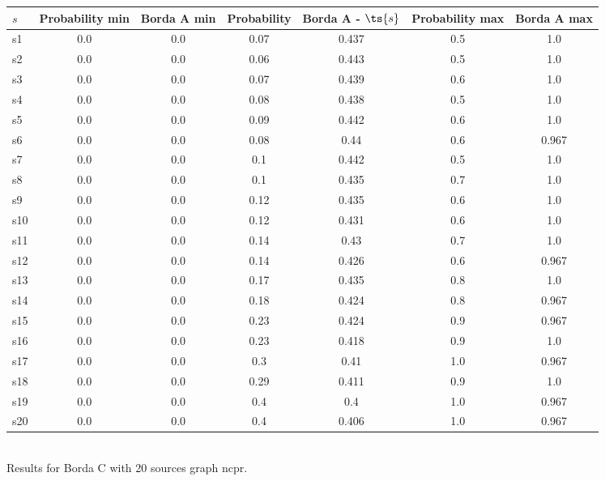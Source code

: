 \documentclass{article}
\begin{document}
\noindent\begin{tabular}{|l|c|c|c|c|c|c|}
\hline
$s$& Probability min & Borda A min & Probability & Borda A - $\ts{s}$ & Probability max & Borda A max\\
\hline
s1 &0.0 & 0.0 & 0.07 & 0.437 & 0.5 & 1.0\\
\hline
s2 &0.0 & 0.0 & 0.06 & 0.443 & 0.5 & 1.0\\
\hline
s3 &0.0 & 0.0 & 0.07 & 0.439 & 0.6 & 1.0\\
\hline
s4 &0.0 & 0.0 & 0.08 & 0.438 & 0.5 & 1.0\\
\hline
s5 &0.0 & 0.0 & 0.09 & 0.442 & 0.6 & 1.0\\
\hline
s6 &0.0 & 0.0 & 0.08 & 0.44 & 0.6 & 0.967\\
\hline
s7 &0.0 & 0.0 & 0.1 & 0.442 & 0.5 & 1.0\\
\hline
s8 &0.0 & 0.0 & 0.1 & 0.435 & 0.7 & 1.0\\
\hline
s9 &0.0 & 0.0 & 0.12 & 0.435 & 0.6 & 1.0\\
\hline
s10 &0.0 & 0.0 & 0.12 & 0.431 & 0.6 & 1.0\\
\hline
s11 &0.0 & 0.0 & 0.14 & 0.43 & 0.7 & 1.0\\
\hline
s12 &0.0 & 0.0 & 0.14 & 0.426 & 0.6 & 0.967\\
\hline
s13 &0.0 & 0.0 & 0.17 & 0.435 & 0.8 & 1.0\\
\hline
s14 &0.0 & 0.0 & 0.18 & 0.424 & 0.8 & 0.967\\
\hline
s15 &0.0 & 0.0 & 0.23 & 0.424 & 0.9 & 0.967\\
\hline
s16 &0.0 & 0.0 & 0.23 & 0.418 & 0.9 & 1.0\\
\hline
s17 &0.0 & 0.0 & 0.3 & 0.41 & 1.0 & 0.967\\
\hline
s18 &0.0 & 0.0 & 0.29 & 0.411 & 0.9 & 1.0\\
\hline
s19 &0.0 & 0.0 & 0.4 & 0.4 & 1.0 & 0.967\\
\hline
s20 &0.0 & 0.0 & 0.4 & 0.406 & 1.0 & 0.967\\
\hline
\end{tabular}\\

\noindent Results for Borda C with 20 sources graph ncpr.
\end{document}
